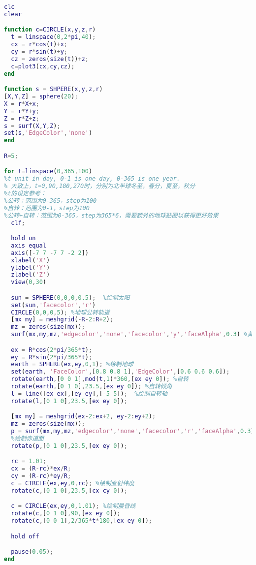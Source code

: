 \begin{lstlisting}[language=matlab]
clc
clear

function c=CIRCLE(x,y,z,r)
  t = linspace(0,2*pi,40);
  cx = r*cos(t)+x;
  cy = r*sin(t)+y;
  cz = zeros(size(t))+z;
  c=plot3(cx,cy,cz);
end

function s = SHPERE(x,y,z,r)
[X,Y,Z] = sphere(20);
X = r*X+x;
Y = r*Y+y;
Z = r*Z+z;
s = surf(X,Y,Z);
set(s,'EdgeColor','none')
end

R=5;

for t=linspace(0,365,100) 
%t unit in day, 0-1 is one day, 0-365 is one year.
% 大致上，t=0,90,180,270时，分别为北半球冬至，春分，夏至，秋分
%t的设定参考：
%公转：范围为0-365，step为100
%自转：范围为0-1，step为100
%公转+自转：范围为0-365，step为365*6，需要额外的地球贴图以获得更好效果
  clf;

  hold on
  axis equal
  axis([-7 7 -7 7 -2 2])
  xlabel('X')
  ylabel('Y')
  zlabel('Z')
  view(0,30)

  sun = SPHERE(0,0,0,0.5);  %绘制太阳
  set(sun,'facecolor','r')
  CIRCLE(0,0,0,5); %地球公转轨道
  [mx my] = meshgrid(-R-2:R+2);
  mz = zeros(size(mx));
  surf(mx,my,mz,'edgecolor','none','facecolor','y','faceAlpha',0.3) %黄道面

  ex = R*cos(2*pi/365*t);
  ey = R*sin(2*pi/365*t);
  earth = SPHERE(ex,ey,0,1); %绘制地球
  set(earth, 'FaceColor',[0.8 0.8 1],'EdgeColor',[0.6 0.6 0.6]);
  rotate(earth,[0 0 1],mod(t,1)*360,[ex ey 0]); %自转
  rotate(earth,[0 1 0],23.5,[ex ey 0]); %自转倾角
  l = line([ex ex],[ey ey],[-5 5]);  %绘制自转轴
  rotate(l,[0 1 0],23.5,[ex ey 0]);

  [mx my] = meshgrid(ex-2:ex+2, ey-2:ey+2);
  mz = zeros(size(mx));
  p = surf(mx,my,mz,'edgecolor','none','facecolor','r','faceAlpha',0.3);  
  %绘制赤道面
  rotate(p,[0 1 0],23.5,[ex ey 0]);

  rc = 1.01;
  cx = (R-rc)*ex/R;
  cy = (R-rc)*ey/R;
  c = CIRCLE(ex,ey,0,rc); %绘制直射纬度
  rotate(c,[0 1 0],23.5,[cx cy 0]);

  c = CIRCLE(ex,ey,0,1.01); %绘制晨昏线
  rotate(c,[0 1 0],90,[ex ey 0]);
  rotate(c,[0 0 1],2/365*t*180,[ex ey 0]);

  hold off

  pause(0.05);
end


\end{lstlisting}
